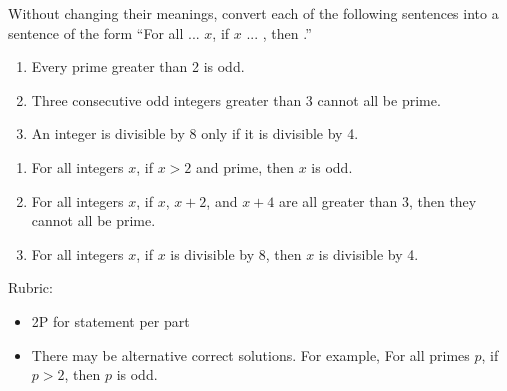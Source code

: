 \documentclass{article}
\theoremstyle{definition}
\begin{document}
\begin{question}{6}
   Without changing their meanings, convert each of the following sentences into a sentence of the form ``For all ... $x$, if $x$ ... , then .''
    \begin{enumerate}
        \item Every prime greater than 2 is odd.
        \item Three consecutive odd integers greater than 3 cannot all be prime.
        \item An integer is divisible by 8 only if it is divisible by 4.
    \end{enumerate}
\end{question}
\begin{solution}
    \begin{enumerate}
        \item For all integers $x$, if $x>2$ and prime, then $x$ is odd. 
        \item For all integers $x$, if $x$, $x+2$, and $x+4$ are all greater than 3, then they cannot all be prime. 
        \item For all integers $x$, if $x$ is divisible by 8, then $x$ is divisible by 4.
    \end{enumerate}

{\color{red} Rubric:
\begin{itemize}
\item 2P for statement per part
\item There may be alternative correct solutions. For example, For all primes $p$, if $p>2$, then $p$ is odd.
\end{itemize}}
\end{solution}
\end{document}
